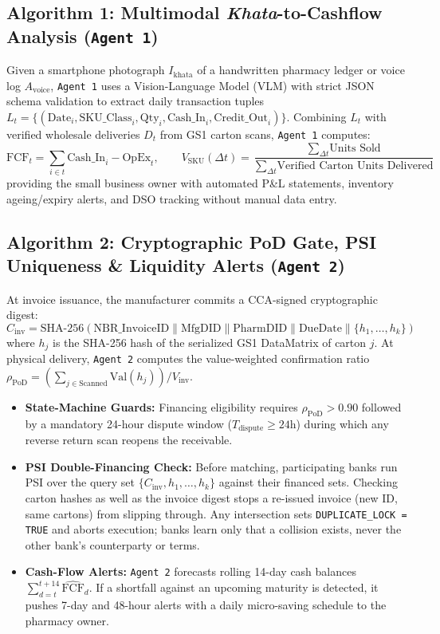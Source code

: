 \documentclass[10pt,a4paper]{article}
\begin{document}
\subsection{Algorithm 1: Multimodal \textit{Khata}-to-Cashflow Analysis (\texttt{Agent 1})}
Given a smartphone photograph $I_{\text{khata}}$ of a handwritten pharmacy ledger or voice log $A_{\text{voice}}$, \texttt{Agent 1} uses a Vision-Language Model (VLM) with strict JSON schema validation to extract daily transaction tuples $L_t = \{(\text{Date}_i, \text{SKU\_Class}_i, \text{Qty}_i, \text{Cash\_In}_i, \text{Credit\_Out}_i)\}$. Combining $L_t$ with verified wholesale deliveries $D_t$ from GS1 carton scans, \texttt{Agent 1} computes:
\begin{equation}
    \text{FCF}_t = \sum_{i \in t} \text{Cash\_In}_i - \text{OpEx}_t, \qquad V_{\text{SKU}}(\Delta t) = \frac{\sum_{\Delta t} \text{Units Sold}}{\sum_{\Delta t} \text{Verified Carton Units Delivered}}
\end{equation}
providing the small business owner with automated P\&L statements, inventory ageing/expiry alerts, and DSO tracking without manual data entry.

\subsection{Algorithm 2: Cryptographic PoD Gate, PSI Uniqueness \& Liquidity Alerts (\texttt{Agent 2})}
At invoice issuance, the manufacturer commits a CCA-signed cryptographic digest:
\begin{equation}
    C_{\text{inv}} = \text{SHA-256}\left(\text{NBR\_InvoiceID} \parallel \text{MfgDID} \parallel \text{PharmDID} \parallel \text{DueDate} \parallel \{h_1, \dots, h_k\}\right)
\end{equation}
where $h_j$ is the SHA-256 hash of the serialized GS1 DataMatrix of carton $j$. At physical delivery, \texttt{Agent 2} computes the value-weighted confirmation ratio $\rho_{\text{PoD}} = (\sum_{j \in \text{Scanned}} \text{Val}(h_j)) / V_{\text{inv}}$.
\begin{itemize}[noitemsep,topsep=2pt]
    \item \textbf{State-Machine Guards:} Financing eligibility requires $\rho_{\text{PoD}} > 0.90$ followed by a mandatory 24-hour dispute window ($T_{\text{dispute}} \ge 24\text{h}$) during which any reverse return scan reopens the receivable.
    \item \textbf{PSI Double-Financing Check:} Before matching, participating banks run PSI over the query set $\{C_{\text{inv}}, h_1, \dots, h_k\}$ against their financed sets. Checking carton hashes as well as the invoice digest stops a re-issued invoice (new ID, same cartons) from slipping through. Any intersection sets \texttt{DUPLICATE\_LOCK = TRUE} and aborts execution; banks learn only that a collision exists, never the other bank's counterparty or terms.
    \item \textbf{Cash-Flow Alerts:} \texttt{Agent 2} forecasts rolling 14-day cash balances $\sum_{d=t}^{t+14} \widehat{\text{FCF}}_d$. If a shortfall against an upcoming maturity is detected, it pushes 7-day and 48-hour alerts with a daily micro-saving schedule to the pharmacy owner.
\end{itemize}
\end{document}
